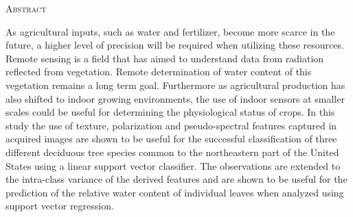 \begin{center}
  \textsc{Abstract}
\end{center}
%
\noindent
%
As agricultural inputs, such as water and fertilizer, become more scarce in the future, a higher level of precision will be required when utilizing these resources. Remote sensing is a field that has aimed to understand data from radiation reflected from vegetation.  Remote determination of water content
of this vegetation remains a long term goal.  Furthermore as agricultural production has also shifted to indoor
growing environments, the use of indoor sensors at smaller scales could be useful for determining the
physiological status of crops. In this study the use of texture, polarization and pseudo-spectral features captured in
acquired images are shown to be useful for the successful classification of
three different deciduous tree species common to the northeastern part of the
United States using a linear support vector classifier. The observations
are extended to the intra-class variance of the derived features and are shown
to be useful for the prediction of the relative water content of individual leaves when
analyzed using support vector regression.
